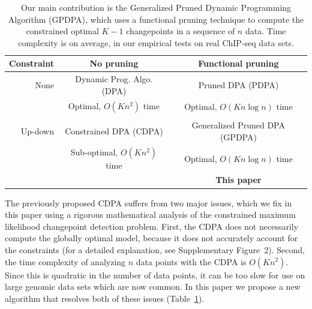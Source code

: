 \documentclass[twoside,11pt]{article}
\begin{document}
\begin{table}[t!]
  \centering
  \begin{tabular}{r|c|c}
    Constraint & No pruning & Functional pruning \\
    \hline
    None & Dynamic Prog. Algo. (DPA) & Pruned DPA (PDPA) \\
    & Optimal, $O(Kn^2)$ time & Optimal, $O(Kn\log n)$ time\\
    & \citet{segment-neighborhood}     & \citet{pruned-dp, phd-johnson} \\
    \hline
    Up-down & Constrained DPA (CDPA) & Generalized Pruned DPA (GPDPA) \\
    & Sub-optimal, $O(Kn^2)$ time & Optimal, $O(Kn\log n)$ time\\
    & \citet{HOCKING-PeakSeg} & \textbf{This paper} \\
    \hline
  \end{tabular}
  \caption{Our main contribution is 
the Generalized Pruned Dynamic Programming Algorithm (GPDPA), 
 which uses a functional pruning technique 
    to compute the constrained optimal $K-1$ changepoints 
in a sequence of $n$ data. 
Time complexity is on average, 
in our empirical tests on real ChIP-seq data sets.}
\label{tab:contribution}
\end{table}

The previously proposed CDPA suffers from two major issues, which we fix in
this paper using a rigorous mathematical analysis of the constrained
maximum likelihood changepoint detection problem. First, the CDPA does
not necessarily compute the globally optimal model, because it does
not accurately account for the constraints (for a detailed
explanation, see Supplementary Figure~2). Second, the time complexity
of analyzing $n$ data points with the CDPA is $O(Kn^2)$. Since this is quadratic in the number of
data points, it can be too slow for use on large genomic data sets
which are now common. In this paper we propose a new algorithm that
resolves both of these issues (Table~\ref{tab:contribution}).
\end{document}

